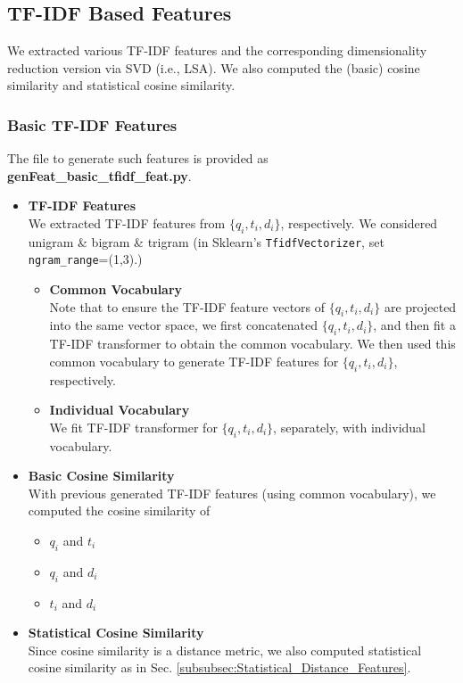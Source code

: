 \documentclass[12pt]{article}
\begin{document}
\subsection{TF-IDF Based Features}
We extracted various TF-IDF features and the corresponding dimensionality reduction version via SVD (i.e., LSA). We also computed the (basic) cosine similarity and statistical cosine similarity.
\subsubsection{Basic TF-IDF Features}
\label{subsubsec:Basic_TFIDF_Features}
The file to generate such features is provided as \textbf{genFeat\_basic\_tfidf\_feat.py}.
\begin{itemize}
\item \textbf{TF-IDF Features}\\
We extracted TF-IDF features from $\{q_i, t_i, d_i\}$, respectively. We considered unigram \& bigram \& trigram (in Sklearn's \texttt{TfidfVectorizer}, set \texttt{ngram\_range}=(1,3).)
\begin{itemize}
\item \textbf{Common Vocabulary}\\
Note that to ensure the TF-IDF feature vectors of $\{q_i, t_i, d_i\}$ are projected into the same vector space, we first concatenated $\{q_i, t_i, d_i\}$, and then fit a TF-IDF transformer to obtain the common vocabulary. We then used this common vocabulary to generate TF-IDF features for $\{q_i, t_i, d_i\}$, respectively.
\item \textbf{Individual Vocabulary}\\
We fit TF-IDF transformer for $\{q_i, t_i, d_i\}$, separately, with individual vocabulary.
\end{itemize}
\item \textbf{Basic Cosine Similarity}\\
With previous generated TF-IDF features (using common vocabulary), we computed the cosine similarity of
\begin{itemize}
\item $q_i$ and $t_i$
\item $q_i$ and $d_i$
\item $t_i$ and $d_i$
\end{itemize}
\item \textbf{Statistical Cosine Similarity}\\
Since cosine similarity is a distance metric, we also computed statistical cosine similarity as in Sec. \ref{subsubsec:Statistical_Distance_Features}.

\end{itemize}
\end{document}
